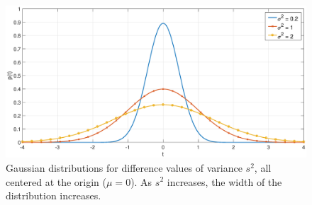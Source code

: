 \documentclass[12pt]{article}
\newcommand{\SD}{s}	%
\begin{document}
\begin{figure}
	\centerline{\includegraphics[scale=0.4]{Figures/GaussianDistributions.eps}}
\caption{Gaussian distributions for difference values of variance $\SD^2$, all centered at the origin ($\mu = 0$). As $\SD^2$ increases, the width of the distribution increases.}
\label{GaussianDistributions}
\end{figure}
\end{document}
